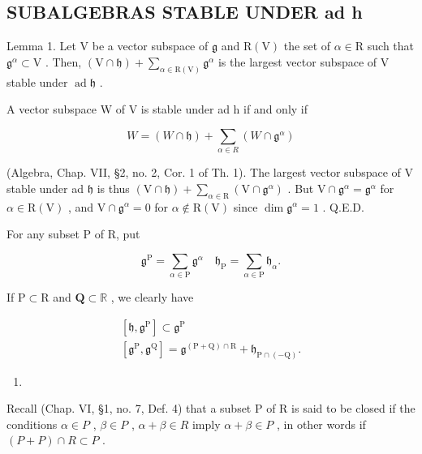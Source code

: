 \subsection{SUBALGEBRAS STABLE UNDER ad h}

Lemma 1. Let \(\mathrm{V}\) be a vector subspace of \(\mathfrak{g}\) and \(\mathrm{R(V)}\) the set of \(\alpha \in \mathrm{R}\) such that \(\mathfrak{g}^{\alpha} \subset \mathrm{V}\) . Then, \((\mathrm{V} \cap \mathfrak{h}) + \sum_{\alpha \in \mathrm{R(V)}} \mathfrak{g}^{\alpha}\) is the largest vector subspace of \(\mathrm{V}\) stable under \(\operatorname{ad} \mathfrak{h}\) .

A vector subspace W of V is stable under ad h if and only if

\[
W = (W \cap \mathfrak {h}) + \sum_ {\alpha \in R} (W \cap \mathfrak {g} ^ {\alpha})
\]

(Algebra, Chap. VII, §2, no. 2, Cor. 1 of Th. 1). The largest vector subspace of V stable under ad \(\mathfrak{h}\) is thus \((\mathrm{V} \cap \mathfrak{h}) + \sum_{\alpha \in \mathrm{R}} (\mathrm{V} \cap \mathfrak{g}^{\alpha})\) . But \(\mathrm{V} \cap \mathfrak{g}^{\alpha} = \mathfrak{g}^{\alpha}\) for \(\alpha \in \mathrm{R}(\mathrm{V})\) , and \(\mathrm{V} \cap \mathfrak{g}^{\alpha} = 0\) for \(\alpha \notin \mathrm{R}(\mathrm{V})\) since \(\dim \mathfrak{g}^{\alpha} = 1\) . Q.E.D.

For any subset P of R, put

\[
\mathfrak {g} ^ {\mathrm{P}} = \sum_ {\alpha \in \mathrm{P}} \mathfrak {g} ^ {\alpha} \quad \mathfrak {h} _ {\mathrm{P}} = \sum_ {\alpha \in \mathrm{P}} \mathfrak {h} _ {\alpha}.
\]

If \(\mathrm{P}\subset \mathrm{R}\) and \(\mathbf{Q}\subset \mathbb{R}\) , we clearly have

\[
\begin{array}{c} {[ \mathfrak {h}, \mathfrak {g} ^ {\mathrm{P}} ] \subset \mathfrak {g} ^ {\mathrm{P}}} \\ {[ \mathfrak {g} ^ {\mathrm{P}}, \mathfrak {g} ^ {\mathrm{Q}} ] = \mathfrak {g} ^ {(\mathrm{P+Q}) \cap \mathrm{R}} + \mathfrak {h} _ {\mathrm{P} \cap (- \mathrm{Q})}.} \end{array}\tag{1}
\]

\begin{enumerate}
\def\labelenumi{(\arabic{enumi})}
\setcounter{enumi}{1}
\tightlist
\item
\end{enumerate}

Recall (Chap. VI, §1, no. 7, Def. 4) that a subset P of R is said to be closed if the conditions \(\alpha \in P\) , \(\beta \in P\) , \(\alpha + \beta \in R\) imply \(\alpha + \beta \in P\) , in other words if \((P + P) \cap R \subset P\) .


